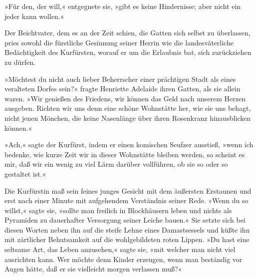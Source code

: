 »Für den, der will,« entgegnete sie, »gibt es keine Hindernisse;
aber nicht ein jeder kann wollen.«

Der Beichtvater, dem es an der Zeit schien, die Gatten sich selbst
zu überlassen, pries sowohl die fürstliche Gesinnung seiner Herrin
wie die landesväterliche Bedächtigkeit des Kurfürsten, worauf er um
die Erlaubnis bat, sich zurückziehen zu dürfen.

»Möchtest du nicht auch lieber Beherrscher einer prächtigen Stadt
als eines veralteten Dorfes sein?« fragte Henriette Adelaide ihren
Gatten, als sie allein waren. »Wir genießen des Friedens, wir
können das Geld nach unserem Herzen ausgeben. Richten wir uns denn
eine schöne Wohnstätte her, wie sie uns behagt, nicht jenen
Mönchen, die keine Nasenlänge über ihren Rosenkranz hinausblicken
können.«

\pagenum{[102]}»Ach,« sagte der Kurfürst, indem er einen komischen
Seufzer ausstieß, »wenn ich bedenke, wie kurze Zeit wir in dieser
Wohnstätte bleiben werden, so scheint es mir, daß wir ein wenig zu
viel Lärm darüber vollführen, ob sie so oder so gestaltet ist.«

Die Kurfürstin maß sein feines junges Gesicht mit dem äußersten
Erstaunen und erst nach einer Minute mit aufgehendem Verständnis
seiner Rede. »Wenn du so willst,« sagte sie, »sollte man freilich
in Blockhäusern leben und nichts als Pyramiden zu dauerhafter
Versorgung seiner Leiche bauen.« Sie setzte sich bei diesen Worten
neben ihn auf die steife Lehne eines Damastsessels und küßte ihn
mit zärtlicher Behutsamkeit auf die wohlgebildeten roten Lippen.
»Du hast eine seltsame Art, das Leben anzusehen,« sagte sie, »mit
welcher man nicht viel ausrichten kann. Wer möchte denn Kinder
erzeugen, wenn man beständig vor Augen hätte, daß er sie vielleicht
morgen verlassen muß?«

